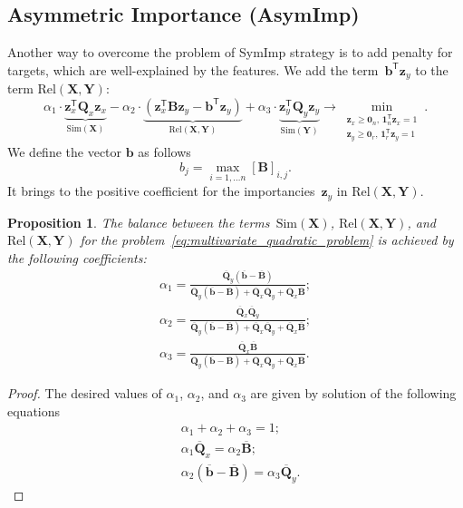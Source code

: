 \documentclass[12pt,oneside]{article}
\newtheorem{proposition}{Proposition}
\theoremstyle{definition}
\newcommand{\bz}{\mathbf{z}}
\newcommand{\bb}{\mathbf{b}}
\newcommand{\bY}{\mathbf{Y}}
\newcommand{\bX}{\mathbf{X}}
\newcommand{\bB}{\mathbf{B}}
\newcommand{\bQ}{\mathbf{Q}}
\newcommand{\T}{\mathsf{T}}
\newcommand{\bOne}{\boldsymbol{1}}
\newcommand{\bZero}{\boldsymbol{0}}
\begin{document}
\subsection{Asymmetric Importance (AsymImp)}
Another way to overcome the problem of SymImp strategy is to add penalty for targets, which are well-explained by the features.
We add the term~$\bb^{\T} \bz_y$ to the term $\text{Rel}(\bX, \bY)$:
\begin{equation}
\alpha_1 \cdot \underbrace{\bz_x^{\T} \bQ_x \bz_x}_{\text{Sim}(\bX)} - \alpha_2 \cdot  \underbrace{\left(\bz_x^{\T} \bB \bz_y - \bb^{\T} \bz_y \right) }_{\text{Rel}(\bX, \bY)} + \alpha_3 \cdot \underbrace{\bz_y^{\T} \bQ_y \bz_y}_{\text{Sim}(\bY)} \rightarrow \min_{\substack{\bz_x \geq \bZero_n, \, \bOne_n^{\T}\bz_x=1 \\ \bz_y \geq \bZero_r, \, \bOne_r^{\T}\bz_y=1}}.
\label{eq:multivariate_quadratic_problem}
\end{equation}
We define the vector $\bb$ as follows
\begin{equation}
	 b_j = \max_{i=1, \dots n} [\bB]_{i, j}.
\end{equation}
 It brings to the positive coefficient for the importancies~$\bz_y$ in $\text{Rel}(\bX, \bY)$.
\begin{proposition}
	The balance between the terms~$\text{Sim}(\bX)$, $\text{Rel}(\bX, \bY)$, and $\text{Rel}(\bX, \bY)$ for the problem~\eqref{eq:multivariate_quadratic_problem} is achieved by the following coefficients:
	\begin{align}
	\alpha_1 = \frac{\overline{\bQ}_y \left( \overline{\bb} - \overline{\bB}\right)}{\overline{\bQ}_y \left( \overline{\bb} - \overline{\bB}\right) + \overline{\bQ}_x \overline{\bQ}_y + \overline{\bQ}_x \overline{\bB}}; \\
	\alpha_2 = \frac{\overline{\bQ}_x \overline{\bQ}_y}{\overline{\bQ}_y \left( \overline{\bb} - \overline{\bB}\right) + \overline{\bQ}_x \overline{\bQ}_y + \overline{\bQ}_x \overline{\bB}}; \\
	\alpha_3  = \frac{\overline{\bQ}_x \overline{\bB}}{\overline{\bQ}_y \left( \overline{\bb} - \overline{\bB}\right) + \overline{\bQ}_x \overline{\bQ}_y + \overline{\bQ}_x \overline{\bB}}.
	\end{align}
\end{proposition}
\begin{proof}
	The desired values of $\alpha_1$, $\alpha_2$, and $\alpha_3$ are given by solution of the following equations
	\begin{align}
	&\alpha_1 + \alpha_2 + \alpha_3 = 1; \\
	&\alpha_1 \overline{\bQ}_x = \alpha_2 \overline{\bB}; \\
	&\alpha_2 \left(\overline{\bb} - \overline{\bB} \right) = \alpha_3 \overline{\bQ}_y.
	\end{align}
\end{proof}
\end{document}
